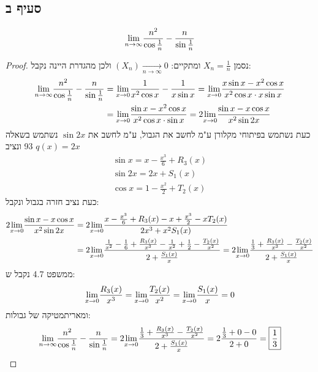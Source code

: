 \documentclass{article}
\begin{document}
	\pagebreak
	\subsection*{סעיף ב}
	\[
		\displaystyle{\lim_{n \to \infty}} \frac{n^2}{\cos \frac{1}{n}} - \frac{n}{\sin \frac{1}{n}}
		\]
	\begin{proof}
		נסמן $X_n = \frac{1}{n}$ ומתקיים: $(X_n) \xrightarrow[n \to \infty]{}0$ ולכן מהגדרת היינה נקבל:
		\begin{align*}
			\displaystyle{\lim_{n \to \infty}} \frac{n^2}{\cos \frac{1}{n}} - \frac{n}{\sin \frac{1}{n}}
			&= \displaystyle{\lim_{x \to 0}} \frac{1}{x^2\cos x} - \frac{1}{x\sin x}
			= \displaystyle{\lim_{x \to 0}} \frac{x\sin x - x^2\cos x}{x^2\cos x \cdot x\sin x} \\
			&= \displaystyle{\lim_{x \to 0}} \frac{\sin x - x^2\cos x}{x^2\cos x \cdot \sin x}
			= 2\displaystyle{\lim_{x \to 0}} \frac{\sin x - x\cos x}{x^2 \sin 2x}
		\end{align*}
		כעת נשתמש בפיתוחי מקלורן ע"מ לחשב את הגבול, ע"מ לחשב את $\sin 2x$ נשתמש בשאלה 93 ונציב $q(x) = 2x$
		\begin{align*}
			\sin x = x - \frac{x^3}{6} + R_3(x) \\
			\sin 2x = 2x + S_1(x) \\
			\cos x = 1 - \frac{x^2}{2} + T_2(x)
		\end{align*}
		כעת נציב חזרה בגבול ונקבל:
		\begin{align*}
			2\displaystyle{\lim_{x \to 0}} \frac{\sin x - x\cos x}{x^2 \sin 2x}
			&= 2\displaystyle{\lim_{x \to 0}} \frac{x - \frac{x^3}{6} + R_3(x) - x + \frac{x^3}{2} - xT_2(x)}{2x^3 + x^2S_1(x)} \\
			&= 2\displaystyle{\lim_{x \to 0}} \frac{\frac{1}{x^2} - \frac{1}{6} + \frac{R_3(x)}{x^3} - \frac{1}{x^2} + \frac{1}{2} - \frac{T_2(x)}{x^2}}{2 + \frac{S_1(x)}{x}}
			= 2\displaystyle{\lim_{x \to 0}} \frac{\frac{1}{3} + \frac{R_3(x)}{x^3} - \frac{T_2(x)}{x^2}}{2 + \frac{S_1(x)}{x}}
		\end{align*}
		ממשפט 4.7 נקבל ש:
		\[
			\displaystyle{\lim_{x \to 0}} \frac{R_3(x)}{x^3} = \displaystyle{\lim_{x \to 0}} \frac{T_2(x)}{x^2} = \displaystyle{\lim_{x \to 0}} \frac{S_1(x)}{x} = 0
		\]
		ומאריתמטיקה של גבולות:
		\begin{align*}
			\displaystyle{\lim_{n \to \infty}} \frac{n^2}{\cos \frac{1}{n}} - \frac{n}{\sin \frac{1}{n}}
			= 2\displaystyle{\lim_{x \to 0}} \frac{\frac{1}{3} + \frac{R_3(x)}{x^3} - \frac{T_2(x)}{x^2}}{2 + \frac{S_1(x)}{x}}
			= 2 \frac{\frac{1}{3} + 0 - 0}{2 + 0}
			= \boxed{\frac{1}{3}}
		\end{align*}
	\end{proof}
\end{document}
